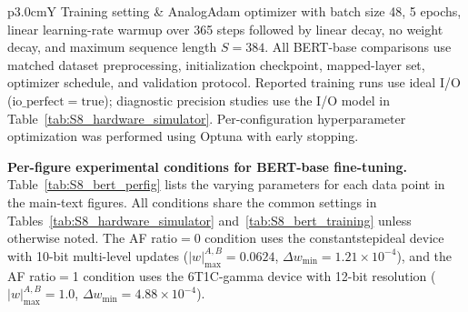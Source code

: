 \documentclass[AMA,LATO1COL]{WileyNJDv5}
\begin{document}
\begin{table}[!htbp]
\begin{tabularx}{\linewidth}{p{3.0cm}Y}
\midrule
Training setting &
AnalogAdam optimizer with batch size 48, 5 epochs, linear learning-rate warmup over 365 steps followed by linear decay, no weight decay, and maximum sequence length \(S=384\). All BERT-base comparisons use matched dataset preprocessing, initialization checkpoint, mapped-layer set, optimizer schedule, and validation protocol. Reported training runs use ideal I/O (\(\mathrm{io\_perfect}=\mathrm{true}\)); diagnostic precision studies use the I/O model in Table~\ref{tab:S8_hardware_simulator}. Per-configuration hyperparameter optimization was performed using Optuna with early stopping. \\
\bottomrule
\end{tabularx}
\end{table}
\FloatBarrier

\noindent\textbf{Per-figure experimental conditions for BERT-base fine-tuning.}
Table~\ref{tab:S8_bert_perfig} lists the varying parameters for each data point in the main-text figures. All conditions share the common settings in Tables~\ref{tab:S8_hardware_simulator} and~\ref{tab:S8_bert_training} unless otherwise noted. The AF ratio\(=\)0 condition uses the constantstepideal device with 10-bit multi-level updates (\(|w|_{\max}^{A,B}=0.0624\), \(\Delta w_{\min}=1.21\times10^{-4}\)), and the AF ratio\(=\)1 condition uses the 6T1C-gamma device with 12-bit resolution (\(|w|_{\max}^{A,B}=1.0\), \(\Delta w_{\min}=4.88\times10^{-4}\)).
\end{document}

